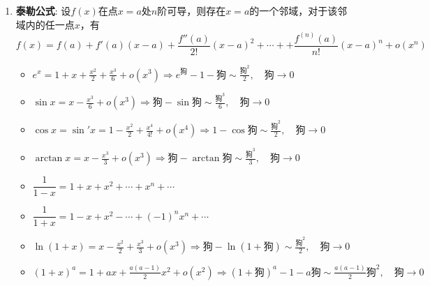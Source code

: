 \documentclass[../book.tex]{subfiles}
\begin{document}
\begin{enumerate}
\begin{itemize}
            若在点 $a$ 的某去心邻域内（或当 $|x|>X$，其中 $X$ 为充分大的正数时），
            $f'(x)$ 与 $F'(x)$ 存在，且
            \[
                F'(x) \neq 0,
            \]
            并且极限
            \[
                \lim_{x\to a} \frac{f'(x)}{F'(x)}
                \quad \text{或} \quad
                \lim_{x\to \infty} \frac{f'(x)}{F'(x)}
            \]
            存在或为无穷大，

            则有
            \[
                \lim_{x\to a} \frac{f(x)}{F(x)}
                =
                \lim_{x\to a} \frac{f'(x)}{F'(x)},
                \qquad
                \lim_{x\to \infty} \frac{f(x)}{F(x)}
                =
                \lim_{x\to \infty} \frac{f'(x)}{F'(x)}.
            \]
        \end{itemize}
        \item \textbf{泰勒公式}: 设$f(x)$在点$x = a$处$n$阶可导，则存在$x = a$的一个邻域，对于该邻域内的任一点$x$，有
        \[
            f(x) = f(a) + f'(a)(x-a) + \frac{f''(a)}{2!}(x-a)^2
            + \cdots +
            + \frac{f^{(n)}(a)}{n!}(x-a)^n + o(x^n)
        \]
        \begin{itemize}
            \item $\displaystyle e^x = 1 + x + \frac{x^2}{2} + \frac{x^3}{6} + o(x^3) \Rightarrow e^{\text{狗}} - 1 - \text{狗} \sim \frac{\text{狗}^2}{2}, \quad \text{狗}\to 0$
            \item $\displaystyle \sin x = x - \frac{x^3}{6} + o(x^3) \Rightarrow \text{狗} - \sin \text{狗} \sim \frac{\text{狗}^3}{6}, \quad \text{狗}\to 0$
            \item $\displaystyle \cos x = \sin' x = 1 - \frac{x^2}{2} + \frac{x^4}{4!} + o(x^4) \Rightarrow 1 - \cos \text{狗} \sim \frac{\text{狗}^2}{2}, \quad \text{狗}\to 0$
            \item $\displaystyle \arctan x = x - \frac{x^3}{3} + o(x^3) \Rightarrow \text{狗} - \arctan \text{狗} \sim \frac{\text{狗}^3}{3}, \quad \text{狗}\to 0$
            \item $\dfrac{1}{1-x} = 1 + x + x^2 + \cdots + x^n + \cdots$
            \item $\dfrac{1}{1+x} = 1 - x + x^2 - \cdots + (-1)^n x^n + \cdots$

            \item $\displaystyle \ln(1+x) = x - \frac{x^2}{2} + \frac{x^3}{3} + o(x^3) \Rightarrow \text{狗} - \ln(1+\text{狗}) \sim \frac{\text{狗}^2}{2}, \quad \text{狗}\to 0$
            \item $\displaystyle (1+x)^a = 1 + ax + \frac{a(a-1)}{2}x^2 + o(x^2) \Rightarrow (1+\text{狗})^a - 1 - a\text{狗} \sim \frac{a(a-1)}{2}\text{狗}^2, \quad \text{狗}\to 0$


\end{itemize}
\end{enumerate}
\end{document}
